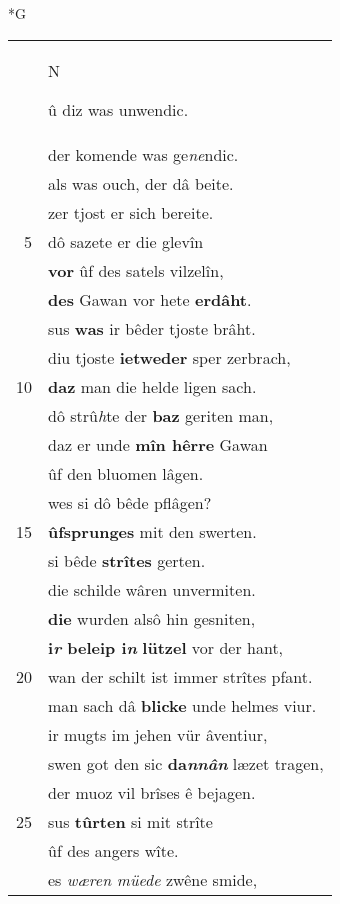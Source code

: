 \documentclass[8pt,a4paper,notitlepage]{article}
\begin{document}
\begin{table}[ht]
\begin{minipage}[t]{0.5\linewidth}
\small
\begin{center}*G
\end{center}
\begin{tabular}{rl}
 & \begin{large}N\end{large}û diz was unwendic.\\ 
 & der komende was ge\textit{ne}ndic.\\ 
 & als was ouch, der dâ beite.\\ 
 & zer tjost er sich bereite.\\ 
5 & dô sazete er die glevîn\\ 
 & \textbf{vor} ûf des satels vilzelîn,\\ 
 & \textbf{des} Gawan vor hete \textbf{erdâht}.\\ 
 & sus \textbf{was} ir bêder tjoste brâht.\\ 
 & diu tjoste \textbf{ietweder} sper zerbrach,\\ 
10 & \textbf{daz} man die helde ligen sach.\\ 
 & dô strû\textit{h}te der \textbf{baz} geriten man,\\ 
 & daz er unde \textbf{mîn hêrre} Gawan\\ 
 & ûf den bluomen lâgen.\\ 
 & wes si dô bêde pflâgen?\\ 
15 & \textbf{ûfsprunges} mit den swerten.\\ 
 & si bêde \textbf{strîtes} gerten.\\ 
 & die schilde wâren unvermiten.\\ 
 & \textbf{die} wurden alsô hin gesniten,\\ 
 & \textbf{i\textit{r} beleip i\textit{n}} \textbf{lützel} vor der hant,\\ 
20 & wan der schilt ist immer strîtes pfant.\\ 
 & man sach dâ \textbf{blicke} unde helmes viur.\\ 
 & ir mugts im jehen vür âventiur,\\ 
 & swen got den sic \textbf{da\textit{nnân}} læzet tragen,\\ 
 & der muoz vil brîses ê bejagen.\\ 
25 & sus \textbf{tûrten} si mit strîte\\ 
 & ûf des angers wîte.\\ 
 & es \textit{wæren müede} zwêne smide,\\ 

\end{tabular}
\end{minipage}
\end{table}
\end{document}
